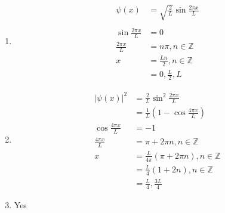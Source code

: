 \documentclass{article}
\begin{document}
\subsubsection{}

\begin{enumerate}
  \item

        \begin{align*}
          \psi(x)                & = \sqrt{\frac{2}{L}} \sin \frac{2 \pi x}{L} \\ \\
          \sin \frac{2 \pi x}{L} & = 0                                         \\
          \frac{2 \pi x}{L}      & = n \pi, n \in \mathbb{Z}                   \\
          x                      & = \frac{L n}{2}, n \in \mathbb{Z}           \\
                                 & = 0, \frac{L}{2}, L
        \end{align*}

  \item

        \begin{align*}
          |\psi(x)|^2            & = \frac{2}{L} \sin^2 \frac{2 \pi x}{L}                  \\
                                 & = \frac{1}{L} \left( 1 - \cos \frac{4 \pi x}{L} \right) \\
          \cos \frac{4 \pi x}{L} & = -1                                                    \\
          \frac{4 \pi x}{L}      & = \pi + 2 \pi n, n \in \mathbb{Z}                       \\
          x                      & = \frac{L}{4 \pi} (\pi + 2 \pi n), n \in \mathbb{Z}     \\
                                 & = \frac{L}{4} (1 + 2 n), n \in \mathbb{Z}               \\
                                 & = \frac{L}{4}, \frac{3 L}{4}
        \end{align*}

  \item Yes
\end{enumerate}

\setcounter{subsubsection}{18}
\subsubsection{}
\end{document}
